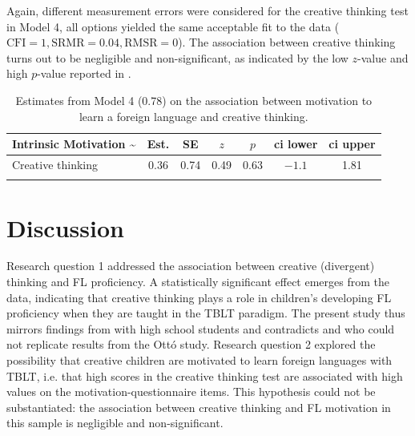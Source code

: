 \documentclass[output=paper]{langsci/langscibook}
\begin{document}
Again, different measurement errors were considered for the creative thinking test in Model 4, all options yielded the same acceptable fit to the data ($\text{CFI}=1, \text{SRMR}= 0.04, \text{RMSR}=0$). The association between creative thinking turns out to be negligible and non-significant, as indicated by the low $z$-value and high $p$-value reported in .   

\begin{table}
\caption{\label{tab:06:3}Estimates from Model 4 (0.78) on the association between motivation to learn a foreign language and creative thinking.}
\begin{tabular}{l cccccc} 
\lsptoprule
{Intrinsic Motivation {\textasciitilde}} & {Est.} & {SE} & {$z$} & {$p$} & {ci lower} & {ci upper}\\\midrule
Creative thinking & 0.36 & 0.74 & 0.49 & 0.63 & $-1.1$ & 1.81\\
\lspbottomrule
\end{tabular}
\end{table}

\section{Discussion}

Research question 1 addressed the association between creative (divergent) thinking and FL proficiency. A statistically significant effect emerges from the data, indicating that creative thinking plays a role in children’s developing FL proficiency when they are taught in the TBLT paradigm. The present study thus mirrors findings from \citet{Otto1998} with high school students and contradicts \citet{Albert2006} and \citet{AlbertKormos2011} who could not replicate results from the Ottó study. Research question 2 explored the possibility that creative children are motivated to learn foreign languages with TBLT, i.e. that high scores in the creative thinking test are associated with high values on the motivation-questionnaire items. This hypothesis could not be substantiated: the association between creative thinking and FL motivation in this sample is negligible and non-significant. 
\end{document}
